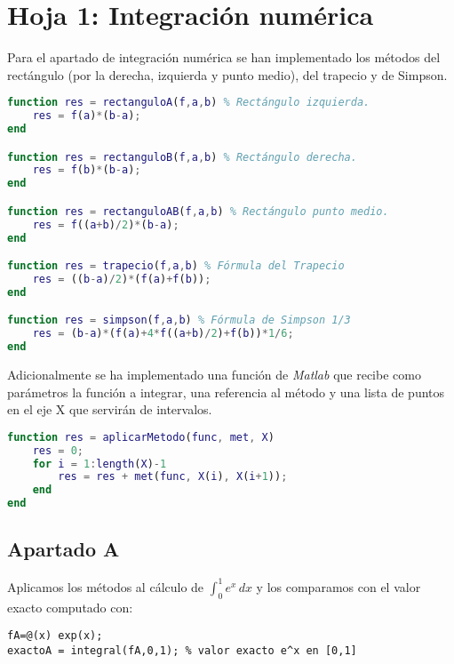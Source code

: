 \section{Hoja 1: Integración numérica}

Para el apartado de integración numérica se han implementado los métodos del rectángulo (por la derecha, izquierda y punto medio), del trapecio y de Simpson.

\begin{lstlisting}[language=Matlab, caption={Fórmulas de integración.},captionpos=b,texcl=true]
function res = rectanguloA(f,a,b) % Rectángulo izquierda.
    res = f(a)*(b-a);
end

function res = rectanguloB(f,a,b) % Rectángulo derecha.
    res = f(b)*(b-a);
end

function res = rectanguloAB(f,a,b) % Rectángulo punto medio.
    res = f((a+b)/2)*(b-a);
end

function res = trapecio(f,a,b) % Fórmula del Trapecio
    res = ((b-a)/2)*(f(a)+f(b));
end

function res = simpson(f,a,b) % Fórmula de Simpson 1/3 
    res = (b-a)*(f(a)+4*f((a+b)/2)+f(b))*1/6;
end
\end{lstlisting}

Adicionalmente se ha implementado una función de \textit{Matlab} que recibe como parámetros la función a integrar, una referencia al método y una lista de puntos en el eje X que servirán de intervalos.

\begin{lstlisting}[language=Matlab, caption={Función que aplica el método de integración en los intervalos.},captionpos=b,texcl=true]
% Para aplicar diversos métodos en el apartado B
function res = aplicarMetodo(func, met, X)
    res = 0;
    for i = 1:length(X)-1
        res = res + met(func, X(i), X(i+1));
    end
end
\end{lstlisting}

\subsection{Apartado A}
Aplicamos los métodos al cálculo de \(\int_{0}^{1} e^x \,dx\) y los comparamos con el valor exacto computado con:
\begin{lstlisting}
fA=@(x) exp(x);
exactoA = integral(fA,0,1); % valor exacto e^x en [0,1]
\end{lstlisting}

